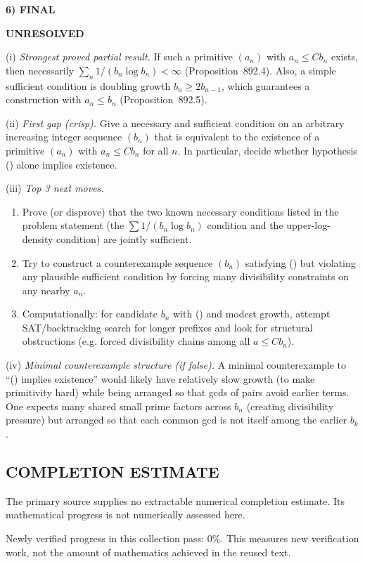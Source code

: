 \medskip
\noindent\textbf{6) FINAL}

\textbf{UNRESOLVED}

(i) \emph{Strongest proved partial result.}
If such a primitive $(a_n)$ with $a_n\le Cb_n$ exists, then necessarily
$\sum_n 1/(b_n\log b_n)<\infty$ (Proposition~892.4). Also, a simple sufficient
condition is doubling growth $b_n\ge 2b_{n-1}$, which guarantees a construction
with $a_n\le b_n$ (Proposition~892.5).

(ii) \emph{First gap (crisp).}
Give a necessary and sufficient condition on an arbitrary increasing integer
sequence $(b_n)$ that is equivalent to the existence of a primitive
$(a_n)$ with $a_n\le Cb_n$ for all $n$.
In particular, decide whether hypothesis (\*) alone implies existence.

(iii) \emph{Top 3 next moves.}
\begin{enumerate}
\item Prove (or disprove) that the two known necessary conditions listed in the
problem statement (the $\sum 1/(b_n\log b_n)$ condition and the upper-log-density
condition) are jointly sufficient.
\item Try to construct a counterexample sequence $(b_n)$ satisfying (\*) but
violating any plausible sufficient condition by forcing many divisibility
constraints on any nearby $a_n$.
\item Computationally: for candidate $b_n$ with (\*) and modest growth, attempt
SAT/backtracking search for longer prefixes and look for structural obstructions
(e.g. forced divisibility chains among all $a\le Cb_n$).
\end{enumerate}

(iv) \emph{Minimal counterexample structure (if false).}
A minimal counterexample to “(\*) implies existence” would likely have relatively
slow growth (to make primitivity hard) while being arranged so that gcds of pairs
avoid earlier terms. One expects many shared small prime factors across $b_n$
(creating divisibility pressure) but arranged so that each common gcd is not
itself among the earlier $b_k$.




\subsection*{COMPLETION ESTIMATE}
The primary source supplies no extractable numerical completion estimate. Its mathematical progress is not numerically assessed here.

Newly verified progress in this collection pass: $0\%$. This measures new verification work, not the amount of mathematics achieved in the reused text.
